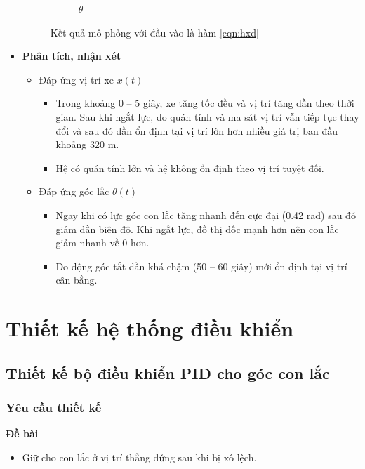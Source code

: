 \documentclass[12pt,a4paper]{article}
\begin{document}
\begin{itemize}
\begin{figure}[ht]
\begin{subfigure}[b]{0.495\linewidth}
            \caption{$\theta$}
        \end{subfigure}
        \caption{Kết quả mô phỏng với đầu vào là hàm \eqref{eqn:hxd}}
    \end{figure}
    \item \textbf{Phân tích, nhận xét}
    \begin{itemize}
        \item Đáp ứng vị trí xe $x(t)$
        \begin{itemize}
            \item Trong khoảng 0 -- 5 giây, xe tăng tốc đều và vị trí tăng dần theo thời gian. Sau khi ngắt lực, do quán tính và ma sát vị trí vẫn tiếp tục thay đổi và sau đó dần ổn định tại vị trí lớn hơn nhiều giá trị ban đầu khoảng 320 m.
            \item Hệ có quán tính lớn và hệ không ổn định theo vị trí tuyệt đối.
        \end{itemize}
        \item Đáp ứng góc lắc $\theta(t)$
        \begin{itemize}
            \item Ngay khi có lực góc con lắc tăng nhanh đến cực đại (0.42 rad) sau đó giảm dần biên độ. Khi ngắt lực, đồ thị dốc mạnh hơn nên con lắc giảm nhanh về 0 hơn.
            \item Do động góc tắt dần khá chậm (50 -- 60 giây) mới ổn định tại vị trí cân bằng. 
        \end{itemize}
    \end{itemize}
\end{itemize}


\newpage
\section{Thiết kế hệ thống điều khiển}
\subsection{Thiết kế bộ điều khiển PID cho góc con lắc}
\subsubsection{Yêu cầu thiết kế}
\begin{minipage}[t]{0.3\linewidth}
    \textbf{Đề bài}
\end{minipage}\begin{minipage}[t]{0.6\linewidth}
    \begin{itemize}
        \item Giữ cho con lắc ở vị trí thẳng đứng sau khi bị xô lệch. 
    \end{itemize}
\end{minipage}
\end{document}
